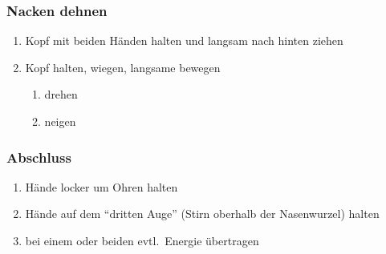 \subsubsection{Nacken dehnen}
\begin{enumerate}
\item Kopf mit beiden Händen halten und langsam nach hinten ziehen
\item Kopf halten, wiegen, langsame bewegen
	\begin{enumerate}
	\item drehen
	\item neigen
	\end{enumerate}
\end{enumerate}

\subsubsection{Abschluss}
\begin{enumerate}
\item Hände locker um Ohren halten
\item Hände auf dem "`dritten Auge"' (Stirn oberhalb der Nasenwurzel) halten
\item bei einem oder beiden evtl.~Energie übertragen
\end{enumerate}
